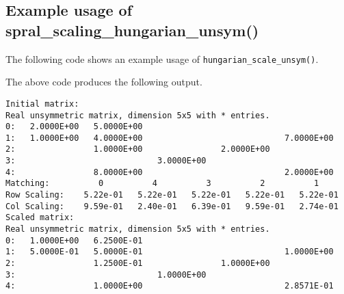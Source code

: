 \subsection{Example usage of spral\_scaling\_hungarian\_unsym()}
The following code shows an example usage of \texttt{hungarian\_scale\_unsym()}.

The above code produces the following output.
\begin{verbatim}
Initial matrix:
Real unsymmetric matrix, dimension 5x5 with * entries.
0:   2.0000E+00   5.0000E+00                                       
1:   1.0000E+00   4.0000E+00                             7.0000E+00
2:                1.0000E+00                2.0000E+00             
3:                             3.0000E+00                          
4:                8.0000E+00                             2.0000E+00
Matching:          0          4          3          2          1
Row Scaling:    5.22e-01   5.22e-01   5.22e-01   5.22e-01   5.22e-01
Col Scaling:    9.59e-01   2.40e-01   6.39e-01   9.59e-01   2.74e-01
Scaled matrix:
Real unsymmetric matrix, dimension 5x5 with * entries.
0:   1.0000E+00   6.2500E-01                                       
1:   5.0000E-01   5.0000E-01                             1.0000E+00
2:                1.2500E-01                1.0000E+00             
3:                             1.0000E+00                          
4:                1.0000E+00                             2.8571E-01
\end{verbatim}
